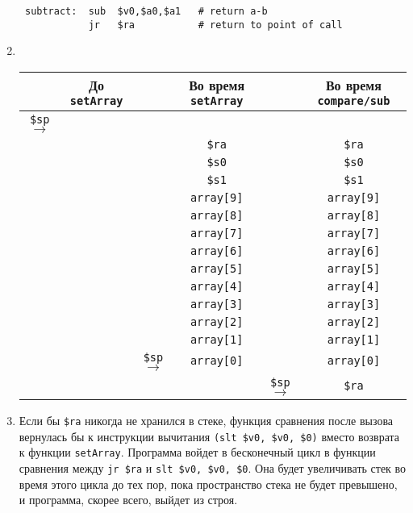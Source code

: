 \documentclass[12pt]{article}
\begin{document}
\begin{enumerate}
\begin{verbatim}
 subtract:  sub  $v0,$a0,$a1   # return a-b
            jr   $ra           # return to point of call
        \end{verbatim}
        \item ~
        \begin{table}[h!]
            \small
            \setlength\tabcolsep{2pt}
            \centering
            \begin{tabular}{cccccc}
                & До \texttt{setArray} & & Во время \texttt{setArray} & & Во время \texttt{compare/sub} \\
                \hline
                \texttt{\$sp} $\rightarrow$ & & & & & \\
                \hline
                & & & \texttt{\$ra} & & \texttt{\$ra} \\
                & & & \texttt{\$s0} & & \texttt{\$s0} \\
                & & & \texttt{\$s1} & & \texttt{\$s1} \\
                & & & \texttt{array[9]} & & \texttt{array[9]} \\
                & & & \texttt{array[8]} & & \texttt{array[8]} \\
                & & & \texttt{array[7]} & & \texttt{array[7]} \\
                & & & \texttt{array[6]} & & \texttt{array[6]} \\
                & & & \texttt{array[5]} & & \texttt{array[5]} \\
                & & & \texttt{array[4]} & & \texttt{array[4]} \\
                & & & \texttt{array[3]} & & \texttt{array[3]} \\
                & & & \texttt{array[2]} & & \texttt{array[2]} \\
                & & & \texttt{array[1]} & & \texttt{array[1]} \\
                & & \texttt{\$sp} $\rightarrow$  & \texttt{array[0]} & & \texttt{array[0]} \\
                \hline
                & & &  & \texttt{\$sp} $\rightarrow$  & \texttt{\$ra} \\
            \end{tabular}
        \end{table}
        \item Если бы \texttt{\$ra} никогда не хранился в стеке, функция сравнения после вызова вернулась бы к инструкции вычитания \texttt{(slt \$v0, \$v0, \$0)} вместо возврата к функции \texttt{setArray}. Программа войдет в бесконечный цикл в функции сравнения между \texttt{jr \$ra} и \texttt{slt \$v0, \$v0, \$0}. Она будет увеличивать стек во время этого цикла до тех пор, пока пространство стека не будет превышено, и программа, скорее всего, выйдет из строя.
    \end{enumerate}
\end{document}
